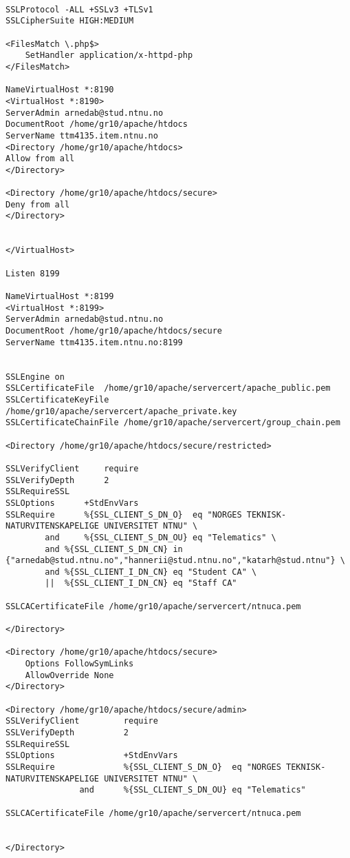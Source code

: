 \begin{lstlisting}

SSLProtocol -ALL +SSLv3 +TLSv1
SSLCipherSuite HIGH:MEDIUM

<FilesMatch \.php$>
    SetHandler application/x-httpd-php
</FilesMatch>

NameVirtualHost *:8190
<VirtualHost *:8190>
ServerAdmin arnedab@stud.ntnu.no
DocumentRoot /home/gr10/apache/htdocs
ServerName ttm4135.item.ntnu.no
<Directory /home/gr10/apache/htdocs>
Allow from all
</Directory>

<Directory /home/gr10/apache/htdocs/secure>
Deny from all
</Directory>


</VirtualHost>

Listen 8199

NameVirtualHost *:8199
<VirtualHost *:8199>
ServerAdmin arnedab@stud.ntnu.no
DocumentRoot /home/gr10/apache/htdocs/secure
ServerName ttm4135.item.ntnu.no:8199


SSLEngine on
SSLCertificateFile 	/home/gr10/apache/servercert/apache_public.pem
SSLCertificateKeyFile	/home/gr10/apache/servercert/apache_private.key
SSLCertificateChainFile	/home/gr10/apache/servercert/group_chain.pem

<Directory /home/gr10/apache/htdocs/secure/restricted>

SSLVerifyClient 	require
SSLVerifyDepth		2 
SSLRequireSSL	
SSLOptions 		+StdEnvVars
SSLRequire 		%{SSL_CLIENT_S_DN_O}  eq "NORGES TEKNISK-NATURVITENSKAPELIGE UNIVERSITET NTNU" \
		and 	%{SSL_CLIENT_S_DN_OU} eq "Telematics" \
		and	%{SSL_CLIENT_S_DN_CN} in {"arnedab@stud.ntnu.no","hannerii@stud.ntnu.no","katarh@stud.ntnu"} \
		and	%{SSL_CLIENT_I_DN_CN} eq "Student CA" \
		|| 	%{SSL_CLIENT_I_DN_CN} eq "Staff CA"

SSLCACertificateFile /home/gr10/apache/servercert/ntnuca.pem

</Directory>

<Directory /home/gr10/apache/htdocs/secure>
	Options FollowSymLinks
	AllowOverride None
</Directory>

<Directory /home/gr10/apache/htdocs/secure/admin>
SSLVerifyClient         require
SSLVerifyDepth          2
SSLRequireSSL
SSLOptions              +StdEnvVars
SSLRequire              %{SSL_CLIENT_S_DN_O}  eq "NORGES TEKNISK-NATURVITENSKAPELIGE UNIVERSITET NTNU" \
               and      %{SSL_CLIENT_S_DN_OU} eq "Telematics"

SSLCACertificateFile /home/gr10/apache/servercert/ntnuca.pem


</Directory>


\end{lstlisting}
